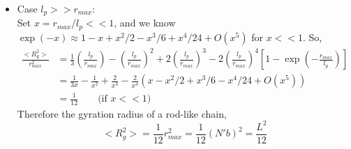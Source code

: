 \documentclass{article}
\begin{document}
\begin{enumerate}
\begin{itemize}
        \item Case $l_p >> r_{max}$: \\
            Set $x=r_{max} / l_p<< 1$, and we know $\exp (-x) \approx 1 - x + x^2/2 - x^3/6 + x^4 / 24 + O(x^5)$ for $x<<1$.
            So, 
            \[
                \begin{aligned}
                    \frac{ <R_g^2 >}{ r_{max}^2 } 
                    &= \frac{1}{3} \left( \frac{l_p}{r_{max}} \right)
                   -            \left( \frac{l_p}{r_{max}} \right)^2
                   +2           \left( \frac{l_p}{r_{max}} \right)^3
                   -2           \left( \frac{l_p}{r_{max}} \right)^4 \left[ 1-\exp\left( - \frac{r_{max}}{l_p} \right)  \right] \\
                   &= \frac{1}{3x} -  \frac{1}{x^2} + \frac{2}{x^3} - \frac{2}{x^4} \left( x - x^2/2 + x^3/6 - x^4 / 24 + O(x^5)\right) \\
                   &=\frac{1}{12} \qquad \text{(if $x << 1$)}
                \end{aligned}
            \]
            Therefore the gyration radius of a rod-like chain,
            \[
                <R_g^2> =  \frac{1}{12} r_{max}^2 = \frac{1}{12} (N'b)^2 = \frac{L^2}{12}
            \]

    \end{itemize}
 
    
\end{enumerate}
\end{document}
